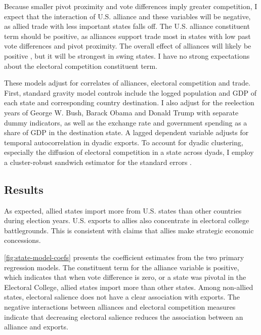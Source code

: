 \documentclass[12pt]{article}
\begin{document}
Because smaller pivot proximity and vote differences imply greater competition, I expect that the interaction of U.S. alliance and these variables will be negative, as allied trade with less important states falls off.
The U.S. alliance constituent term should be positive, as alliances support trade most in states with low past vote differences and pivot proximity.
The overall effect of alliances will likely be positive \citep{GowaMansfield2004, Fordham2010}, but it will be strongest in swing states. 
I have no strong expectations about the electoral competition constituent term.


These models adjust for correlates of alliances, electoral competition and trade.
First, standard gravity model controls include the logged population and GDP of each state and corresponding country destination. 
I also adjust for the reelection years of George W. Bush, Barack Obama and Donald Trump with separate dummy indicators, as well as the exchange rate and government spending as a share of GDP in the destination state. 
A lagged dependent variable adjusts for temporal autocorrelation in dyadic exports.
To account for dyadic clustering, especially the diffusion of electoral competition in a state across dyads, I employ a cluster-robust sandwich estimator for the standard errors \citep{Aronowetal2015}.



\subsection{Results}

As expected, allied states import more from U.S. states than other countries during election years. 
U.S. exports to allies also concentrate in electoral college battlegrounds. 
This is consistent with claims that allies make strategic economic concessions. 


\autoref{fig:state-model-coefs} presents the coefficient estimates from the two primary regression models. 
The constituent term for the alliance variable is positive, which indicates that when vote difference is zero, or a state was pivotal in the Electoral College, allied states import more than other states. 
Among non-allied states, electoral salience does not have a clear association with exports. 
The negative interactions between alliances and electoral competition measures indicate that decreasing electoral salience reduces the association between an alliance and exports. 
\end{document}
